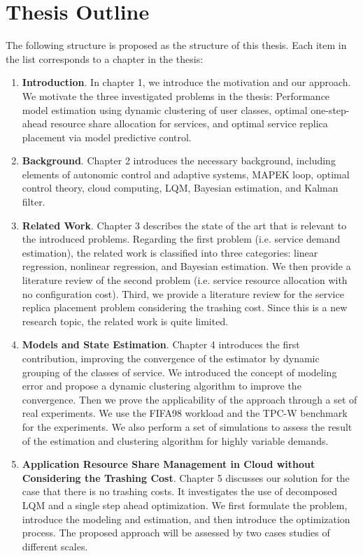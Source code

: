 \documentclass[11pt]{article}
\begin{document}
  \section{ Thesis Outline}
     The following structure is proposed as the structure of this thesis. Each item in the list corresponds to a chapter in the thesis:  
    \begin{enumerate}
    
      \item \textbf{Introduction}. In chapter 1, we introduce the motivation and our approach. We motivate the three investigated problems in the thesis:
			Performance model estimation using dynamic clustering of user classes, optimal one-step-ahead resource share allocation for services, and optimal service replica placement via model predictive control.
			
    \item \textbf{Background}. Chapter 2 introduces the necessary background, including elements of autonomic control and adaptive systems, MAPEK loop, optimal control theory, cloud computing, LQM, Bayesian estimation, and Kalman filter. 

  \item \textbf{Related Work}. Chapter 3 describes the state of the art that is relevant to the introduced problems. Regarding the first problem (i.e. service demand estimation), the related work is classified into three categories: linear regression, nonlinear regression, and Bayesian estimation. We then provide a literature review of the second problem (i.e. service resource allocation with no configuration cost). Third, we provide a literature review for the service replica placement problem considering the trashing cost. Since this is a new research topic, the related work is quite limited.
	 
  \item  \textbf{Models and State Estimation}.  
  Chapter 4 introduces the first contribution, improving the convergence of the estimator by dynamic grouping of the classes of service. We introduced the concept of modeling error and propose a dynamic clustering algorithm to improve the convergence. Then we prove the applicability of the approach through a set of real experiments. We use the FIFA98 workload and the TPC-W benchmark for the experiments. We also perform a set of simulations to assess the result of the estimation and clustering algorithm for highly variable demands.  

\item \textbf{Application Resource Share Management in Cloud without Considering the Trashing Cost}. Chapter 5 discusses our solution for the case that there is no trashing costs. It investigates the use of decomposed LQM and a single step ahead optimization. 
We first formulate the problem, introduce the modeling and estimation, and then introduce the optimization process. The proposed approach will be assessed by two cases studies of different scales. 


\end{enumerate}
\end{document}
